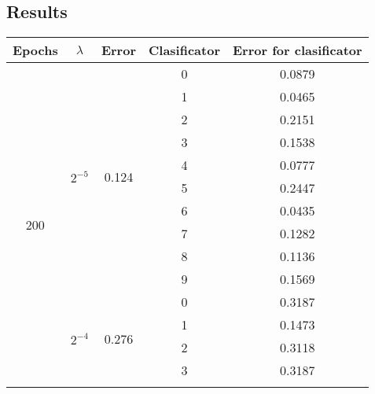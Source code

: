 \documentclass[a4paper,12pt]{article}
\begin{document}
\subsection*{Results}
\begin{table}[h]
\begin{tabular}{ |c|c|c|c|c| }
\hline
Epochs                & $\lambda$ & Error & Clasificator & Error for clasificator  \\ \hline
\multirow{30}{*}{200} & \multirow{10}{*}{$2^{-5}$}              & \multirow{10}{*}{0.124} & 0 & 0.0879 \\ \cline{4-5} 
                      &                                         &                         & 1 & 0.0465 \\ \cline{4-5} 
                      &                                         &                         & 2 & 0.2151 \\ \cline{4-5} 
                      &                                         &                         & 3 & 0.1538 \\ \cline{4-5} 
                      &                                         &                         & 4 & 0.0777 \\ \cline{4-5} 
                      &                                         &                         & 5 & 0.2447 \\ \cline{4-5} 
                      &                                         &                         & 6 & 0.0435 \\ \cline{4-5} 
                      &                                         &                         & 7 & 0.1282 \\ \cline{4-5} 
                      &                                         &                         & 8 & 0.1136 \\ \cline{4-5} 
                      &                                         &                         & 9 & 0.1569 \\ \cline{2-5} 
					  &              \multirow{10}{*}{$2^{-4}$} & \multirow{10}{*}{0.276} & 0 & 0.3187 \\ \cline{4-5} 
                      &                                         &                         & 1 & 0.1473 \\ \cline{4-5} 
                      &                                         &                         & 2 & 0.3118 \\ \cline{4-5} 
                      &                                         &                         & 3 & 0.3187 \\ \cline{4-5} 

\end{tabular}
\end{table}
\end{document}

